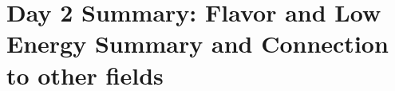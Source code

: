 \section{Day 2 Summary: Flavor and Low Energy Summary and Connection to other 
fields}\label{discussionconnetion}



